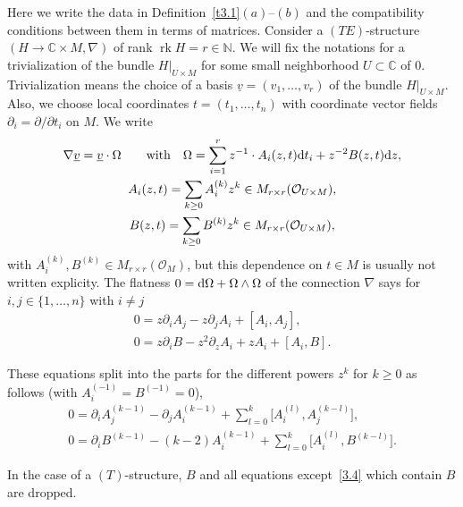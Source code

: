 \documentclass[pdftex]{sigma}%
\numberwithin{equation}{section}
\numberwithin{figure}{section}
\newcommand{\N}{{\mathbb N}}
\newcommand{\C}{{\mathbb C}}
\newcommand{\OO}{{\mathcal O}}
\newcommand{\ddd}{{\rm d}}
\newcommand{\uuuu}{\underline}
\newcommand{\paa}{\partial}
\newcommand{\nnn}{\nabla}
\DeclareMathOperator{\rk}{rk}
\begin{document}
\begin{Remark}\label{t3.2}
Here we write the data in Definition~\ref{t3.1}$(a)$--$(b)$
and the compatibility conditions between them in terms
of matrices.
Consider a $(TE)$-structure $(H\to\C\times M,\nnn)$
of rank $\rk H=r\in\N$.
We will fix the notations for a trivialization
of the bundle $H|_{U\times M}$ for some small neighborhood
$U\subset \C$ of 0. Trivialization means the choice of a
basis $\uuuu{v}=(v_1,\dots ,v_r)$ of the bundle $H|_{U\times M}$.
Also, we choose local coordinates $t=(t_1,\dots ,t_n)$
with coordinate vector fields $\paa_i=\paa/\paa t_i$ on $M$.
We write\vspace{-1ex}
\begin{gather}
\nnn\uuuu{v}=\uuuu{v}\cdot\Omega\qquad\text{with}\quad
\Omega = \sum_{i=1}^r z^{-1}\cdot A_i(z,t)\ddd t_i +z^{-2}B(z,t)\ddd z,
\label{3.4}
\\
A_i(z,t)= \sum_{k\geq 0}A_i^{(k)}z^k\in M_{r\times r}(\OO_{U\times M}),
\label{3.5}
\\
B(z,t)=\sum_{k\geq 0} B^{(k)}z^k\in M_{r\times r}(\OO_{U\times M}),
\label{3.6}
\end{gather}
with $A_i^{(k)},B^{(k)}\in M_{r\times r}(\OO_M)$,
but this dependence on $t\in M$ is usually not written
explicity.
The flatness $0=\ddd \Omega+\Omega\land\Omega$ of the connection
$\nnn$ says for $i,j\in\{1,\dots ,n\}$ with $i\neq j${\samepage
\begin{gather}\label{3.7}
0= z\paa_iA_j-z\paa_jA_i+[A_i,A_j],\\
0= z\paa_i B-z^2\paa_z A_i + zA_i + [A_i,B].
\label{3.8}
\end{gather}}

\pagebreak

\noindent
These equations split into the parts for the different powers
$z^k$ for $k\geq 0$ as follows \big(with $A_i^{(-1)}=B^{(-1)}=0$\big),
\begin{gather}\label{3.9}
0= \paa_iA_j^{(k-1)}-\paa_jA_i^{(k-1)}+\sum_{l=0}^k\big[A_i^{(l)},A_j^{(k-l)}\big],
\\
0= \paa_i B^{(k-1)}-(k-2)A_i^{(k-1)}+\sum_{l=0}^k\big[A_i^{(l)},B^{(k-l)}\big].
\label{3.10}
\end{gather}

In the case of a $(T)$-structure, $B$ and all
equations except~\eqref{3.4} which contain $B$ are dropped.


\end{Remark}
\end{document}
